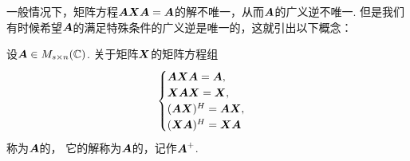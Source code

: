 一般情况下，矩阵方程\(\boldsymbol{A} \boldsymbol{X} \boldsymbol{A} = \boldsymbol{A}\)的解不唯一，从而\(\boldsymbol{A}\)的广义逆不唯一.
但是我们有时候希望\(\boldsymbol{A}\)的满足特殊条件的广义逆是唯一的，这就引出以下概念：
\begin{definition}
设\(\boldsymbol{A} \in M_{s \times n}(\mathbb{C})\).
关于矩阵\(\boldsymbol{X}\)的矩阵方程组\begin{equation}\label{equation:线性方程组.彭罗斯方程组}
	\begin{cases}
		\boldsymbol{A} \boldsymbol{X} \boldsymbol{A} = \boldsymbol{A}, \\
		\boldsymbol{X}\boldsymbol{A}\boldsymbol{X}=\boldsymbol{X}, \\
		(\boldsymbol{A}\boldsymbol{X})^H = \boldsymbol{A}\boldsymbol{X}, \\
		(\boldsymbol{X}\boldsymbol{A})^H = \boldsymbol{X}\boldsymbol{A}
	\end{cases}
\end{equation}
称为\(\boldsymbol{A}\)的，
它的解称为\(\boldsymbol{A}\)的，记作\(\boldsymbol{A}^+\).
\end{definition}

